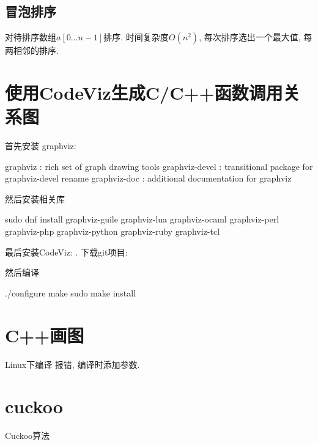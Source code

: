 \subsection{冒泡排序}
对待排序数组$a[0...n-1]$排序.
时间复杂度$O(n^2)$, 每次排序选出一个最大值, 每两相邻的排序.

\section{使用CodeViz生成C/C++函数调用关系图}
首先安装 graphviz: 

\begin{shell}
 graphviz : rich set of graph drawing tools
 graphviz-devel : transitional package for graphviz-devel rename
 graphviz-doc : additional documentation for graphviz
\end{shell}
然后安装相关库
\begin{shell}
sudo dnf install graphviz-guile graphviz-lua graphviz-ocaml graphviz-perl graphviz-php graphviz-python graphviz-ruby graphviz-tcl
\end{shell}
最后安装CodeViz: . 下载git项目: 


然后编译
\begin{shell}
 ./configure
 make
 sudo make install
\end{shell}


\newpage
\section{C++画图}
Linux下编译
报错, 
编译时添加参数.

\newpage
\section{cuckoo}
Cuckoo算法

\newpage